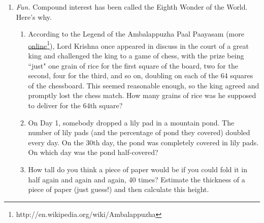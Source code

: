 \begin{enumerate}
\begin{enumerate}
    \end{enumerate}















\item \emph{Fun.} Compound interest has been called the Eighth Wonder of the World. Here's why.

    \begin{enumerate}

    \item According to the Legend of the Ambalappuzha Paal Paayasam (more \href{http://en.wikipedia.org/wiki/Ambalappuzha}{online}\footnote{http://en.wikipedia.org/wiki/Ambalappuzha}), Lord Krishna once appeared in discuss in the court of a great king and challenged the king to a game of chess, with the prize being ``just" one grain of rice for the first square of the board, two for the second, four for the third, and so on, doubling on each of the 64 squares of the chessboard. This seemed reasonable enough, so the king agreed and promptly lost the chess match. How many grains of rice was he supposed to deliver for the 64th square?


    \item On Day 1, somebody dropped a lily pad in a mountain pond. The number of lily pads (and the percentage of pond they covered) doubled every day. On the 30th day, the pond was completely covered in lily pads. On which day was the pond half-covered?


    \item How tall do you think a piece of paper would be if you could fold it in half again and again and again, 40 times? Estimate the thickness of a piece of paper (just guess!) and then calculate this height.
    \end{enumerate}


\end{enumerate}
